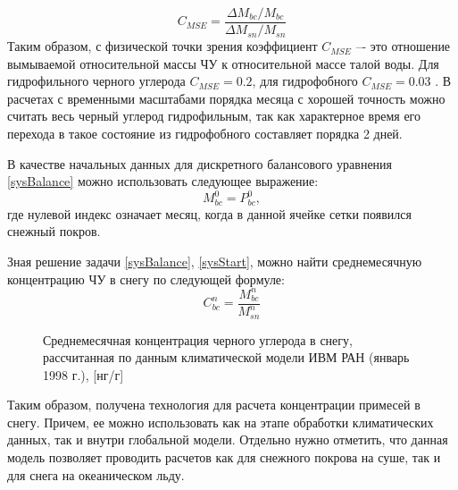 \documentclass[a4paper, fontsize=14pt]{scrartcl}
\begin{document}
\begin{equation}
   C_{MSE} = \dfrac{\Delta M_{bc} / M_{bc}}{\Delta M_{sn} / M_{sn}}     \label{sys}
\end{equation}
Таким образом, с физической точки зрения коэффициент $C_{MSE}$ –- это отношение вымываемой относительной массы ЧУ к относительной
массе талой воды. Для гидрофильного черного углерода $C_{MSE} = 0.2$, для гидрофобного $C_{MSE} = 0.03$ \cite{Flanner2007, Conway1996}. В расчетах с временными масштабами порядка месяца с хорошей точность можно считать весь черный углерод гидрофильным, так как характерное время его перехода в такое состояние из гидрофобного составляет порядка 2 дней.

В качестве начальных данных для дискретного балансового уравнения \eqref{sysBalance} можно использовать следующее выражение:
\begin{equation}
    M_{bc}^0 = P_{bc}^0, \label{sysStart}
\end{equation}
где нулевой индекс означает месяц, когда в данной ячейке сетки появился снежный покров. 

Зная решение задачи \eqref{sysBalance}, \eqref{sysStart}, можно найти среднемесячную концентрацию ЧУ в снегу по следующей формуле:
\begin{equation}
   C_{bc}^n = \dfrac{M_{bc}^n}{M_{sn}^n}  \label{sys}
\end{equation}

\begin{figure}[h]
    \caption{Среднемесячная концентрация черного углерода в снегу, рассчитанная по данным климатической модели ИВМ РАН (январь 1998 г.), [нг/г]}
    \label{fig:image}
\end{figure}

Таким образом, получена технология для расчета концентрации примесей в снегу. Причем, ее можно использовать как на этапе обработки климатических данных, так и внутри глобальной модели. Отдельно нужно отметить, что данная модель позволяет проводить расчетов как для снежного покрова на суше, так и для снега на океаническом льду.
\end{document}
